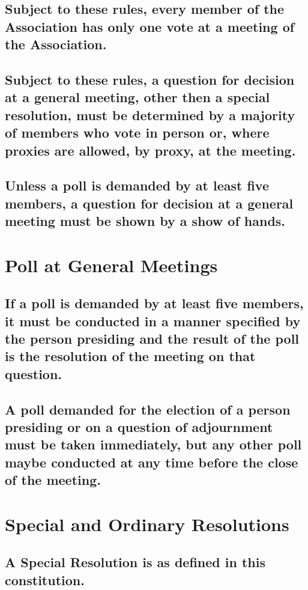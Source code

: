 \documentclass{article}
\newenvironment{subs}
  {\adjustwidth{2em}{0pt}}
  {\endadjustwidth}
\begin{document}
\begin{subs}
\begin{subs}
\begin{subs}
\subsection{Subject to these rules, every member of the Association has only one vote at a meeting of the Association.}
\subsection{Subject to these rules, a question for decision at a general meeting, other then a special resolution, must be determined by a majority of members who vote in person or, where proxies are allowed, by proxy, at the meeting.}
\newpage

\subsection{Unless a poll is demanded by at least five members, a question for decision at a general meeting must be shown by a show of hands.}
\end{subs}

\section{Poll at General Meetings}
\begin{subs}
\subsection{If a poll is demanded by at least five members, it must be conducted in a manner specified by the person presiding and the result of the poll is the resolution of the meeting on that question.}
\subsection{A poll demanded for the election of a person presiding or on a question of adjournment must be taken immediately, but any other poll maybe conducted at any time before the close of the meeting.}
\end{subs}

\section{Special and Ordinary Resolutions}
\begin{subs}
\subsection{A Special Resolution is as defined in this constitution.}

\end{subs}
\end{subs}
\end{subs}
\end{document}
